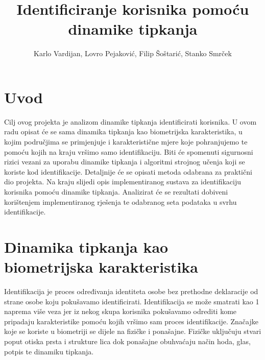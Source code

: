 \documentclass[]{foi}
\title{Identificiranje korisnika pomoću dinamike tipkanja}
\author{Karlo Vardijan, Lovro Pejaković, Filip Šoštarić, Stanko Smrček}
\begin{document}
\maketitle

\tableofcontents

\makeatletter {} \makeatother
\pagestyle{plain}



\chapter{Uvod}

Cilj ovog projekta je analizom dinamike tipkanja identificirati korisnika. U ovom radu opisat će se sama dinamika tipkanja kao biometrijska karakteristika, u kojim područjima se primjenjuje i karakteristične mjere koje pohranjujemo te pomoću kojih na kraju vršimo samo identifikaciju. Biti će spomenuti sigurnosni rizici vezani za uporabu dinamike tipkanja i algoritmi strojnog učenja koji se koriste kod identifikacije. Detaljnije će se opisati metoda odabrana za praktični dio projekta. Na kraju slijedi opis implementiranog sustava za identifikaciju korisnika pomoću dinamike tipkanja. Analizirat će se rezultati dobiveni korištenjem implementiranog rješenja te odabranog seta podataka u svrhu identifikacije.

\chapter{Dinamika tipkanja kao biometrijska karakteristika}
Identifikacija je proces određivanja identiteta osobe bez prethodne deklaracije od strane osobe koju pokušavamo identificirati.\cite{Kasprowski2022} Identifikacija se može smatrati kao 1 naprema više veza jer iz nekog skupa korisnika pokušavamo odrediti kome pripadaju karakteristike pomoću kojih vršimo sam proces identifikacije. Značajke koje se koriste u biometriji se dijele na fizičke i ponašajne. Fizičke uključuju stvari poput otiska prsta i strukture lica dok ponašajne obuhvaćaju način hoda, glas, potpis te dinamiku tipkanja.\cite{Kasprowski2022}
\end{document}

